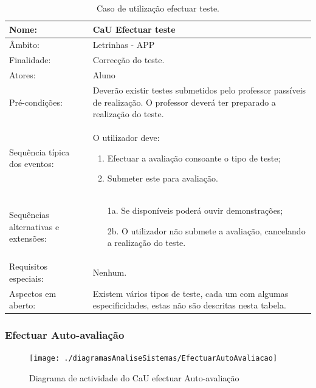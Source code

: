 \documentclass[a4paper]{article}
\begin{document}
					


				\newpage
				\begin {table}[h]
				\begin{tabular}{|p{2cm} p{10cm}|}
					\hline Nome: & CaU Efectuar teste \\ 
					\hline Âmbito: & Letrinhas - APP \\ 
					\hline Finalidade: & Correcção do teste. \\ 
					\hline Atores: & Aluno \\ 
				    \hline Pré-condições: & Deverão existir testes submetidos pelo  professor passíveis de realização.
					O professor deverá ter preparado a realização do teste. \\ 
				    \hline Sequência típica dos eventos: &  					
					O utilizador deve:
				    \begin{enumerate}
				    	\item	Efectuar a avaliação consoante o tipo de teste;
						\item	Submeter este para avaliação.
				    \end{enumerate} \\ 
  				    \hline Sequências alternativas e extensões: & 
  				    \begin{enumerate}			    	
  				    	\item[1a.] Se disponíveis poderá ouvir demonstrações;
						\item[2b.] O utilizador não submete a avaliação, cancelando a realização do teste.

  				    \end{enumerate}
  				     \\ 
  				    \hline Requisitos especiais: & Nenhum.\\ 
  				    \hline Aspectos em aberto: & Existem vários tipos de teste, cada um com algumas especificidades, estas não são descritas nesta tabela.  \\
					\hline 
				\end{tabular}
				\caption{Caso de utilização efectuar teste.}
			\end{table} 
			
		\newpage				
			\subsubsection{Efectuar Auto-avaliação}
						
				\begin{figure}[h]
\centering
\texttt{[image: ./diagramasAnaliseSistemas/EfectuarAutoAvaliacao]}
\caption{Diagrama de actividade do CaU efectuar Auto-avaliação}
\label{fig:EfectuarAutoAvaliacao}
\end{figure}
\end{document}
